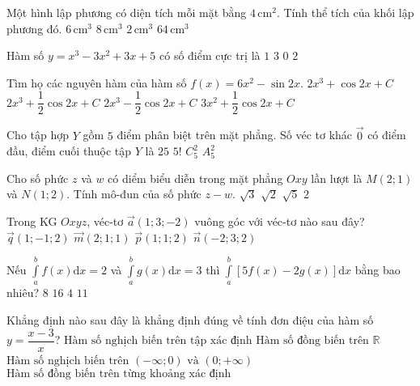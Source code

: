 \begin{ex}%
Một hình lập phương có diện tích mỗi mặt bằng $4\mathrm{\,cm}^2$. Tính thể tích của khối lập phương đó.
\choice
{$6\mathrm{\,cm}^3$}
{\True $8\mathrm{\,cm}^3$}
{$2\mathrm{\,cm}^3$}
{$64\mathrm{\,cm}^3$}

\end{ex}
\begin{ex}%
Hàm số $y=x^3-3 x^2+3 x+5$ có số điểm cực trị là
\choice
{$1$}
{$3$}
{\True $0$}
{$2$}

\end{ex}
\begin{ex}%
Tìm họ các nguyên hàm của hàm số $f(x)=6 x^2-\sin 2 x$.
\choice
{$2 x^3+\cos 2 x+C$}
{\True $2 x^3+\dfrac{1}{2} \cos 2 x+C$}
{$2 x^3-\dfrac{1}{2} \cos 2 x+C$}
{$3 x^2+\dfrac{1}{2} \cos 2 x+C$}

\end{ex}
\begin{ex}%
Cho tập hợp $Y$ gồm $5$ điểm phân biệt trên mặt phẳng. Số véc tơ khác $\overrightarrow{0}$ có điểm đầu, điểm cuối thuộc tập $Y$ là
\choice
{$25$}
{$5!$}
{$C_5^2$}
{\True $A_5^2$}

\end{ex}
\begin{ex}%
Cho số phức $z$ và $w$ có diểm biểu diễn trong mặt phẳng $O x y$ lần lượt là $M(2; 1)$ và $N(1; 2)$. Tính mô-đun của số phức $z-w$.
\choice
{$\sqrt{3}$}
{\True $\sqrt{2}$}
{$\sqrt{5}$}
{$2$}

\end{ex}
\begin{ex}%
Trong KG $Oxyz$, véc-tơ $\vec{a}(1; 3;-2)$ vuông góc với véc-tơ nào sau đây?
\choice
{$\vec{q}(1;-1; 2)$}
{$\vec{m}(2; 1; 1)$}
{\True $\vec{p}(1; 1; 2)$}
{$\vec{n}(-2; 3; 2)$}

\end{ex}
\begin{ex}%
Nếu $\displaystyle\int\limits_a^{b} f(x) \mathrm{d} x=2$ và $\displaystyle\int\limits_a^{b} g(x) \mathrm{d} x=3$ thì $\displaystyle\int\limits_a^{b}[5 f(x)-2 g(x)] \mathrm{d} x$ bằng bao nhiêu?
\choice
{$8$}
{$16$}
{\True $4$}
{$11$}

\end{ex}
\begin{ex}%
Khẳng định nào sau đây là khẳng định đúng về tính đơn điệu của hàm số $y=\dfrac{x-3}{x}$?
\choice
{$\text{Hàm số nghịch biến trên tập xác định}$}
{$\text{Hàm số đồng biến trên}$ $\mathbb{R}$}
{$\text{Hàm số nghịch biến trên}$ $(-\infty; 0)$ $\text{và}$ $(0;+\infty)$}
{\True $\text{Hàm số đồng biến trên từng khoảng xác định}$}

\end{ex}

